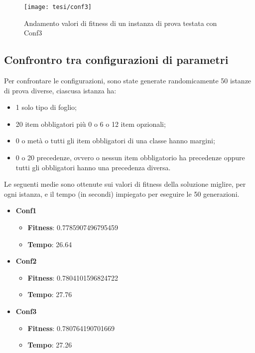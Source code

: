 \begin{figure}[!ht] 
    \centering 
    \texttt{[image: tesi/conf3]} 
    \caption{Andamento valori di fitness di un instanza di prova testata con Conf3}
\end{figure}

\subsection{Confrontro tra configurazioni di parametri} \hypertarget{ttest}{}

Per confrontare le configurazioni, sono state generate randomicamente 50 istanze di prova diverse, ciascusa istanza ha:
\begin{itemize}
	\item 1 solo tipo di foglio;
	\item 20 item obbligatori più 0 o 6 o 12 item opzionali;
	\item 0 o metà o tutti gli item obbligatori di una classe hanno margini;
	\item 0 o 20 precedenze, ovvero o nessun item obbligatorio ha precedenze oppure tutti gli obbligatori hanno una precedenza diversa.
\end{itemize}

Le seguenti medie sono ottenute sui valori di fitness della soluzione miglire, per ogni istanza, e il tempo (in secondi) impiegato per eseguire le 50 generazioni.

\begin{itemize}
    \item \textbf{Conf1}
    \begin{itemize}
        \item\textbf{Fitness}: 0.7785907496795459
        \item\textbf{Tempo}: 26.64 
    \end{itemize}
    \item \textbf{Conf2}
    \begin{itemize}
        \item\textbf{Fitness}: 0.7804101596824722
        \item\textbf{Tempo}: 27.76
    \end{itemize}
    \item \textbf{Conf3}
    \begin{itemize}
        \item\textbf{Fitness}: 0.780764190701669
        \item\textbf{Tempo}: 27.26
    \end{itemize}
\end{itemize}

